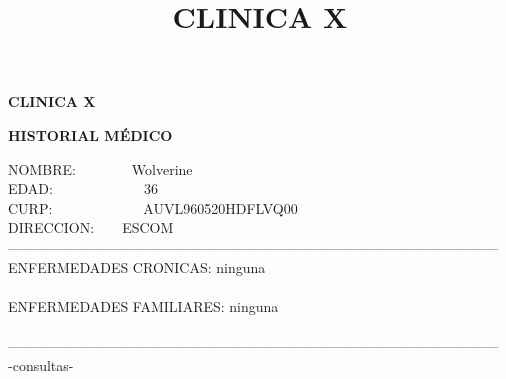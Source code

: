 \documentclass[10pt,a4paper]{letter}
\title{\bf CLINICA X}
\begin{document}
\begin{center}
{\scshape\LARGE \bf CLINICA X\par}
{\bf HISTORIAL MÉDICO\\}
\end{center}
NOMBRE:\ \ \ \ \ \ \ \ Wolverine\\
EDAD:\ \ \ \ \ \ \ \ \ \ \ \ \ 36\\
CURP:\ \ \ \ \ \ \ \ \ \ \ \ \ AUVL960520HDFLVQ00 \\
DIRECCION:\ \ \ \ ESCOM\\
--------------------------------------------------------------------------------------------------------- \\
ENFERMEDADES CRONICAS: ninguna\\ \\
ENFERMEDADES FAMILIARES: ninguna \\ \\
--------------------------------------------------------------------------------------------------------- \\-consultas-
\end{document}
